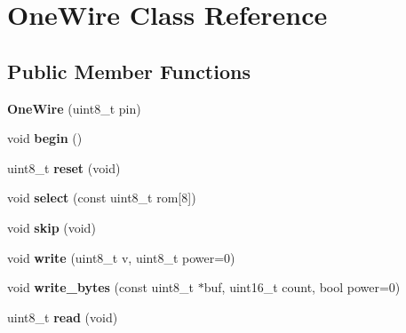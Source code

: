 \hypertarget{class_one_wire}{}\section{One\+Wire Class Reference}
\label{class_one_wire}
\subsection*{Public Member Functions}
\begin{DoxyCompactItemize}
\item 
\hypertarget{class_one_wire_aa3f23dc51d861a8d257648c507b14e8d}{}{\bfseries One\+Wire} (uint8\+\_\+t pin)\label{class_one_wire_aa3f23dc51d861a8d257648c507b14e8d}

\item 
\hypertarget{class_one_wire_acc6da81f961028fe654497c1e45f19a3}{}void {\bfseries begin} ()\label{class_one_wire_acc6da81f961028fe654497c1e45f19a3}

\item 
\hypertarget{class_one_wire_a6a742a9112392567eae3d06dde067c07}{}uint8\+\_\+t {\bfseries reset} (void)\label{class_one_wire_a6a742a9112392567eae3d06dde067c07}

\item 
\hypertarget{class_one_wire_accf808390abd63d3c7bce35677784384}{}void {\bfseries select} (const uint8\+\_\+t rom\mbox{[}8\mbox{]})\label{class_one_wire_accf808390abd63d3c7bce35677784384}

\item 
\hypertarget{class_one_wire_ae3780e2b0ea2ebf6be88298412ac7798}{}void {\bfseries skip} (void)\label{class_one_wire_ae3780e2b0ea2ebf6be88298412ac7798}

\item 
\hypertarget{class_one_wire_a843e9e7e57ed615b4880be0b76b40b7d}{}void {\bfseries write} (uint8\+\_\+t v, uint8\+\_\+t power=0)\label{class_one_wire_a843e9e7e57ed615b4880be0b76b40b7d}

\item 
\hypertarget{class_one_wire_a0fc1e0bdc2ab1f062c98567fa60a69ae}{}void {\bfseries write\+\_\+bytes} (const uint8\+\_\+t $\ast$buf, uint16\+\_\+t count, bool power=0)\label{class_one_wire_a0fc1e0bdc2ab1f062c98567fa60a69ae}

\item 
\hypertarget{class_one_wire_afd9bdb8b5a5b69b394dfc76352e00e21}{}uint8\+\_\+t {\bfseries read} (void)\label{class_one_wire_afd9bdb8b5a5b69b394dfc76352e00e21}


\end{DoxyCompactItemize}
